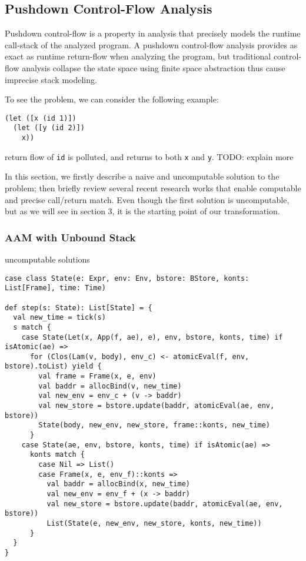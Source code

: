 \documentclass[acmsmall,review,anonymous]{acmart}\settopmatter{printfolios=true,printccs=false,printacmref=false}
\begin{document}

\subsection{Pushdown Control-Flow Analysis}

Pushdown control-flow is a property in analysis that precisely models
the runtime call-stack of the analyzed program. 
A pushdown control-flow analysis provides as exact as runtime return-flow 
when analyzing the program, but traditional control-flow analysis collapse 
the state space using finite space abstraction thus cause imprecise stack modeling.

To see the problem, we can consider the following example:

\begin{verbatim}
(let ([x (id 1)])
  (let ([y (id 2)])
    x))
\end{verbatim}

return flow of \texttt{id} is polluted, and returns to both \texttt{x} and
\texttt{y}. TODO: explain more

In this section, we firstly describe a naive and uncomputable solution to the
problem; then briefly review several recent research works that enable
computable and precise call/return match. Even though the first solution is
uncomputable, but as we will see in section 3, it is the starting point of our
transformation. 

\subsubsection{AAM with Unbound Stack}

uncomputable solutions

\begin{verbatim}
case class State(e: Expr, env: Env, bstore: BStore, konts: List[Frame], time: Time)

def step(s: State): List[State] = {
  val new_time = tick(s)
  s match {
    case State(Let(x, App(f, ae), e), env, bstore, konts, time) if isAtomic(ae) =>
      for (Clos(Lam(v, body), env_c) <- atomicEval(f, env, bstore).toList) yield {
        val frame = Frame(x, e, env)
        val baddr = allocBind(v, new_time)
        val new_env = env_c + (v -> baddr)
        val new_store = bstore.update(baddr, atomicEval(ae, env, bstore))
        State(body, new_env, new_store, frame::konts, new_time)
      }
    case State(ae, env, bstore, konts, time) if isAtomic(ae) =>
      konts match {
        case Nil => List()
        case Frame(x, e, env_f)::konts =>
          val baddr = allocBind(x, new_time)
          val new_env = env_f + (x -> baddr)
          val new_store = bstore.update(baddr, atomicEval(ae, env, bstore))
          List(State(e, new_env, new_store, konts, new_time))
      }
  }
}
\end{verbatim}
\end{document}

